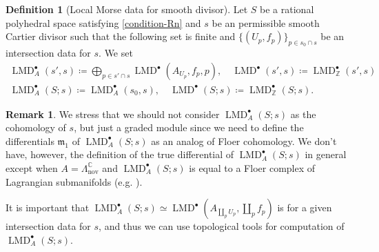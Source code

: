 \documentclass[a4paper,dvipdfmx,reqno,12pt]{amsart}
\theoremstyle{definition}
\newtheorem{definition}[theorem]{Definition}
\newtheorem{remark}[theorem]{Remark}
\newcommand{\deq}{\coloneqq}
\newcommand{\opn}[1]{\operatorname{#1}}
\numberwithin{equation}{section}
\begin{document}
\begin{definition}[{Local Morse data for smooth divisor}]

Let $S$ be a rational polyhedral space 
satisfying \cref{condition-Rn} and 
$s$ be an permissible smooth Cartier divisor such that
the following set is finite and 
$\{(U_p,f_p)\}_{p\in s_0\cap s}$ 
be an intersection data for $s$.
We set
\begin{align}
\opn{LMD}^{\bullet}_{A}(s',s)\deq 
\bigoplus_{p\in s' \cap s} 
\opn{LMD}^{\bullet}(A_{U_p},f_{p},p), \quad 
\opn{LMD}^{\bullet}(s',s)
\deq \opn{LMD}^{\bullet}_{\mathbb{Z}}(s',s)\\
\opn{LMD}^{\bullet}_A(S;s)
\deq \opn{LMD}^{\bullet}_{A}(s_0,s), \quad
\opn{LMD}^{\bullet}(S;s)\deq
\opn{LMD}^{\bullet}_{\mathbb{Z}}(S;s).
\end{align}
\end{definition}

\begin{remark}
\label{remark-differential-graded-module}
We stress that we should not consider 
$\opn{LMD}^{\bullet}_{A}(S;s)$ as the cohomology of $s$,
but just
a graded module 
since we need to define the differentials 
$\mathfrak{m}_1$ of 
$\opn{LMD}^{\bullet}_{A}(S;s)$ as an analog of
Floer cohomology. We don't have, however,
the definition of the true differential of 
$\opn{LMD}^{\bullet}_A(S;s)$ in general except when 
$A=\Lambda_{\mathrm{nov}}^{\mathbb{C}}$ and
$\opn{LMD}^{\bullet}_{A}(S;s)$ is equal to a Floer complex
of Lagrangian submanifolds (e.g. \cite[5.2]{MR1882331}).
\end{remark}

It is important that 
$\opn{LMD}^{\bullet}_{A}(S;s)\simeq \opn{LMD}^{\bullet}(A_{\coprod_{p} U_p},\coprod_p f_p)$ is
for a given intersection data for $s$, and thus
we can use topological tools for computation of 
$\opn{LMD}^{\bullet}_{A}(S;s)$.
\end{document}
